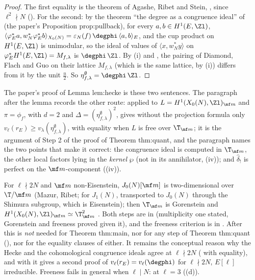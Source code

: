 \begin{proof}
The first equality is the theorem of Agashe, Ribet and Stein, \cite[Theorem 2.2]{ARS12}, since $\ell^2\nmid N$ (). For the second: by the theorem ``the degree as a
congruence ideal'' of  (the paper's Proposition prop:pullback), for every $a,b\in H^1(E,\Zl)$,
$\langle\varphi_E^*a,w_N^*\varphi_E^*b\rangle_{X_0(N)}=\varepsilon_N(f)\,\degphi\,\langle a,b\rangle_E$, and the cup product on $H^1(E,\Zl)$ is unimodular, so the ideal of values of $\langle x,w_N^*y\rangle$ on
$\varphi_E^*H^1(E,\Zl)=M_{f,\lambda}$ is $\degphi\,\Zl$. By (i) and , the pairing of Diamond, Flach and Guo on their
lattice $M_{f,\lambda}$ (which is the same lattice, by (i)) differs from it by the unit $\frac u2$. So
$\eta^\emptyset_{f,\lambda}=\degphi\,\Zl$.
\end{proof}

\begin{paperlink}
The paper's proof of Lemma lem:hecke is these two sentences. The paragraph after the lemma records the other route:  applied
to $L=H^1(X_0(N),\Zl)_{\mf m}$ and $\pi=\phi_f$, with $d=2$ and $\Delta=(\eta^\emptyset_{f,\lambda})^2$, gives without the projection formula only $v_\ell(r_E)\ge v_\lambda(\eta^\emptyset_{f,\lambda})$, with equality when $L$ is free over $\T_{\mf m}$;
it is the argument of Step 2 of the proof of Theorem thm:quant, and the paragraph names the two points that make it correct: the congruence ideal is computed in $\T_{\mf m}$, the other local factors lying in the \emph{kernel} $\wp$ (not in its
annihilator, (iv)); and $\hat\delta_!$ is perfect on the $\mf m$-component ((iv)).
\end{paperlink}

\begin{remark}\label{rem:congruence:rem-free}
For $\ell\nmid2N$ and $\mf m$ non-Eisenstein, $J_0(N)[\mf m]$ is two-dimensional over $\T/\mf m$ (Mazur, Ribet; \cite[Theorem 3.5]{RibetStein} for $J_1(N)$, transported to $J_0(N)$ through the
Shimura subgroup, which is Eisenstein); then $\T_{\mf m}$ is Gorenstein and $H^1(X_0(N),\Zl)_{\mf m}\simeq\T_{\mf m}^2$ \cite{Tilouine97}. Both steps are in  (multiplicity one stated,
Gorenstein and freeness proved given it), and the freeness criterion is in . After  this is \emph{not} needed for Theorem thm:main, nor for any
step of Theorem thm:quant (), nor for the equality clauses of either. It remains the conceptual reason why the Hecke and the cohomological
congruence ideals agree at $\ell\nmid2N$ ( with equality), and with  it gives a second proof of $v_\ell(r_E)=v_\ell(\degphi)$ for
$\ell\nmid2N$, $E[\ell]$ irreducible. Freeness fails in general when $\ell\mid N$:  at $\ell=3$ ((d)).
\end{remark}

